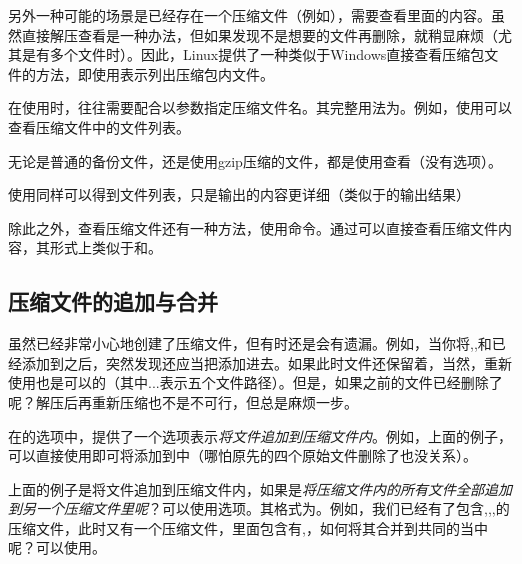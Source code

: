 另外一种可能的场景是已经存在一个压缩文件（例如），需要查看里面的内容。虽然直接解压查看是一种办法，但如果发现不是想要的文件再删除，就稍显麻烦（尤其是有多个文件时）。因此，Linux提供了一种类似于Windows直接查看压缩包文件的方法，即使用表示列出压缩包内文件。

\begin{attention}
    在使用时，往往需要配合以参数指定压缩文件名。其完整用法为。例如，使用可以查看压缩文件中的文件列表。

    无论是普通的备份文件，还是使用gzip压缩的文件，都是使用查看（没有选项）。

    使用同样可以得到文件列表，只是输出的内容更详细（类似于的输出结果）
\end{attention}

除此之外，查看压缩文件还有一种方法，使用命令。通过可以直接查看压缩文件内容，其形式上类似于和。

\subsection{压缩文件的追加与合并}\label{subsec:压缩与解压缩-压缩文件的追加与合并}

虽然已经非常小心地创建了压缩文件，但有时还是会有遗漏。例如，当你将,,和已经添加到之后，突然发现还应当把添加进去。如果此时文件还保留着，当然，重新使用也是可以的（其中...表示五个文件路径）。但是，如果之前的文件已经删除了呢？解压后再重新压缩也不是不可行，但总是麻烦一步。

在的选项中，提供了一个选项表示\emph{将文件追加到压缩文件内}。例如，上面的例子，可以直接使用即可将添加到中（哪怕原先的四个原始文件删除了也没关系）。

上面的例子是将文件追加到压缩文件内，如果是\emph{将压缩文件内的所有文件全部追加到另一个压缩文件里呢}？可以使用选项。其格式为。例如，我们已经有了包含,,,的压缩文件，此时又有一个压缩文件，里面包含有,，如何将其合并到共同的当中呢？可以使用。

